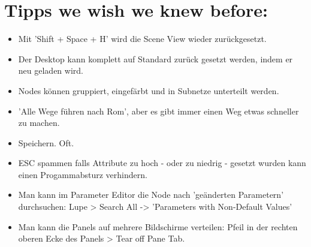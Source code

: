 \documentclass[paper=a4,fontsize=12pt,ngerman]{scrartcl}
\begin{document}
	\section*{\textcolor{rosa}{Tipps we wish we knew before:}}
	\begin{itemize}
		\item Mit 'Shift + Space + H' wird die Scene View wieder zurückgesetzt.
		\item Der Desktop kann komplett auf Standard zurück gesetzt werden, indem er neu geladen wird.
		\item Nodes können gruppiert, eingefärbt und in Subnetze unterteilt werden.
		\item 'Alle Wege führen nach Rom', aber es gibt immer einen Weg etwas schneller zu machen.
		\item Speichern. Oft.
		\item ESC spammen falls Attribute zu hoch - oder zu niedrig - gesetzt wurden kann einen Progammabsturz verhindern.
		\item Man kann im Parameter Editor die Node nach 'geänderten Parametern' durchsuchen: Lupe > Search All -> 'Parameters with Non-Default Values'
		\item Man kann die Panels auf mehrere Bildschirme verteilen: Pfeil in der rechten oberen Ecke des Panels > Tear off Pane Tab.
	\end{itemize}
		
\end{document}

